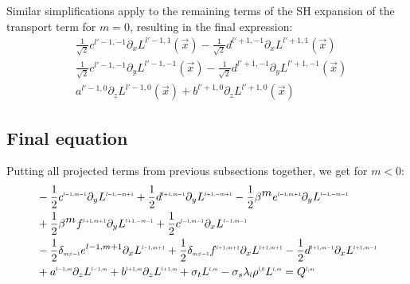 Similar simplifications apply to the remaining terms of the SH expansion of the transport term for $m=0$, resulting in the final expression:
\begin{align*}
&
\frac{1}{\sqrt{2}}c^{{l'-1,-1}}\partial_x L^{{l'-1,1}}\left (\vec{x} \right )
-\frac{1}{\sqrt{2}}d^{{l'+1,-1}}\partial_x L^{{l'+1,1}}\left (\vec{x} \right )
\\&
\frac{1}{\sqrt{2}}c^{{l'-1,-1}}\partial_y L^{{l'-1,-1}}\left (\vec{x} \right )
-\frac{1}{\sqrt{2}}d^{{l'+1,-1}}\partial_y L^{{l'+1,-1}}\left (\vec{x} \right )
\\&
a^{{l'-1,0}}\partial_z L^{{l'-1,0}}\left (\vec{x} \right)
+b^{{l'+1,0}}\partial_z L^{{l'+1,0}}\left (\vec{x} \right)
\end{align*}

\subsection*{Final equation}

Putting all projected terms from previous subsections together, we get for $m<0$:
\begin{align}
&-\frac{1}{2}c^{\scaleto{l-1,m-1}{4pt}}
\partial_y
L^{\scaleto{l-1,-m+1}{4pt}}
+\frac{1}{2}d^{\scaleto{l+1,m-1}{4pt}}
\partial_y
L^{\scaleto{l+1,-m+1}{4pt}}
-\frac{1}{2}\beta^{\scaleto{m}{4pt}}e^{\scaleto{l-1,m+1}{4pt}}
\partial_y
L^{\scaleto{l-1,-m-1}{4pt}}
\nonumber
\\&
+\frac{1}{2}\beta^{\scaleto{m}{4pt}}f^{\scaleto{l+1,m+1}{4pt}}
\partial_y
L^{\scaleto{l+1,-m-1}{4pt}}
+\frac{1}{2}c^{\scaleto{l-1,m-1}{4pt}}
\partial_x
L^{\scaleto{l-1,m-1}{4pt}}
\nonumber
\\&
-\frac{1}{2}\delta_{\scaleto{m\neq -1}{4pt}}e^{{l-1,m+1}}
\partial_x
L^{\scaleto{l-1,m+1}{4pt}}
+\frac{1}{2}\delta_{\scaleto{m\neq -1}{4pt}}f^{\scaleto{l+1,m+1}{4pt}}
\partial_x
L^{\scaleto{l+1,m+1}{4pt}}
-\frac{1}{2}d^{\scaleto{l+1,m-1}{4pt}}
\partial_x
L^{\scaleto{l+1,m-1}{4pt}}
\nonumber
\\&
+a^{\scaleto{l-1,m}{4pt}}
\partial_z
L^{\scaleto{l-1,m}{4pt}}
+b^{\scaleto{l+1,m}{4pt}}
\partial_z
L^{\scaleto{l+1,m}{4pt}}
+\sigma_t L^{\scaleto{l,m}{4pt}}
-\sigma_s\lambda_{\scaleto{l}{4pt}}\phase^{\scaleto{l,0}{4pt}}L^{\scaleto{l,m}{4pt}}
= Q^{\scaleto{l,m}{4pt}}
\end{align}

